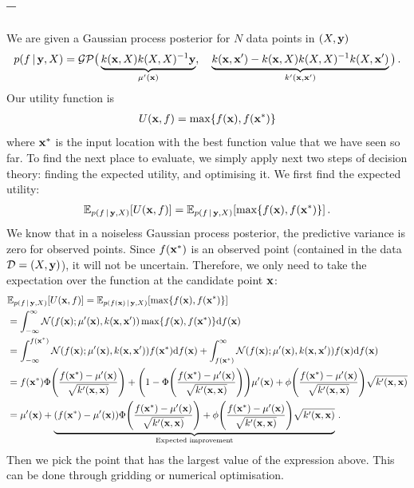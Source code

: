 \documentclass[a4paper]{article}
\newcommand{\questionref}[1]{\Cref{#1} -- \nameref{#1}}
\theoremstyle{definition}
\begin{document}
\subsection{\questionref{q:single-obs-bo}}
We are given a Gaussian process posterior for $N$ data points in $(X, \mathbf{y})$
\begin{align}
p(f\,|\, \mathbf{y}, X) = \mathcal{GP}\big( \underbrace{k(\mathbf{x}, X) k(X, X)^{-1} \mathbf{y}}_{\mu'(\mathbf{x})}, \quad \underbrace{k(\mathbf{x}, \mathbf{x}') - k(\mathbf{x}, X)k(X, X)^{-1} k(X, \mathbf{x}')}_{k'(\mathbf{x}, \mathbf{x}')}\big) \,.
\end{align}
Our utility function is
\begin{align}
U(\vx, f) = \max\left\{f(\vx), f(\vx^*)\right\}
\end{align}
where $\mathbf{x}^*$ is the input location with the best function value that we have seen so far. To find the next place to evaluate, we simply apply next two steps of decision theory: finding the expected utility, and optimising it. We first find the expected utility:
\begin{align}
\Exp{p(f\given\vy, X)}{U(\vx, f)} = \Exp{p(f\given\vy, X)}{\max\left\{f(\vx), f(\vx^*)\right\}} \,.
\end{align}
We know that in a noiseless Gaussian process posterior, the predictive variance is zero for observed points. Since $f(\mathbf{x}^*)$ is an observed point (contained in the data $\mathcal{D} = (X, \mathbf{y})$), it will not be uncertain. Therefore, we only need to take the expectation over the function at the candidate point $\mathbf{x}$:
\begin{align}
&\Exp{p(f\given\vy, X)}{U(\vx, f)} = \Exp{p(f(\vx)\given\vy, X)}{\max\left\{f(\vx), f(\vx^*)\right\}} \nonumber \\
&= \int_{-\infty}^\infty \NormDist{f(\vx); \mu'(\vx), k(\vx, \vx')} \max\left\{f(\vx), f(\vx^*)\right\} \calcd{f(\vx)} \nonumber \\
&= \int_{-\infty}^{f(\vx^*)} \NormDist{f(\vx); \mu'(\vx), k(\vx, \vx')} f(\vx^*) \calcd{f(\vx)} + \int_{f(\vx^*)}^{\infty} \NormDist{f(\vx); \mu'(\vx), k(\vx, \vx')} f(\vx) \calcd{f(\vx)} \nonumber \\
&= f(\vx^*) \Phi\left(\frac{f(\vx^*) - \mu'(\vx)}{\sqrt{k'(\vx, \vx)}}\right) + \left(1 - \Phi\left(\frac{f(\vx^*) - \mu'(\vx)}{\sqrt{k'(\vx, \vx)}}\right) \right)\mu'(\vx) + \phi\left(\frac{f(\vx^*) - \mu'(\vx)}{\sqrt{k'(\vx, \vx)}}\right) \sqrt{k'(\vx, \vx)} \nonumber \\
&= \mu'(\vx) + \underbrace{\left(f(\vx^*) - \mu'(\vx)\right)\Phi\left(\frac{f(\vx^*) - \mu'(\vx)}{\sqrt{k'(\vx, \vx)}}\right) + \phi\left(\frac{f(\vx^*) - \mu'(\vx)}{\sqrt{k'(\vx, \vx)}}\right) \sqrt{k'(\vx, \vx)}}_{\text{Expected improvement}} \,.
\end{align}
Then we pick the point that has the largest value of the expression above. This can be done through gridding or numerical optimisation.
\end{document}
